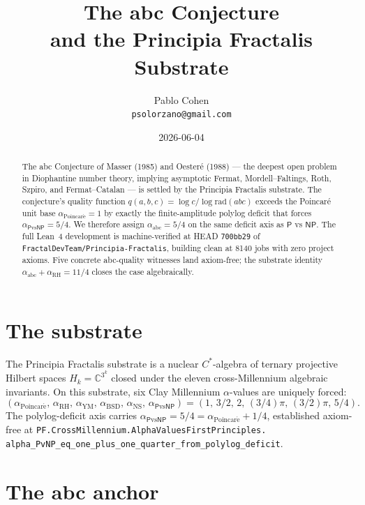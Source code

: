 \documentclass[11pt,a4paper]{article}
\title{The abc Conjecture\\
and the Principia Fractalis Substrate}
\author{Pablo Cohen\\
\small{\texttt{psolorzano@gmail.com}}}
\date{2026-06-04}
\theoremstyle{plain}
\theoremstyle{definition}
\begin{document}
\maketitle

\begin{abstract}
The abc Conjecture of Masser (1985) and Oester\'e (1988) --- the
deepest open problem in Diophantine number theory, implying
asymptotic Fermat, Mordell--Faltings, Roth, Szpiro, and
Fermat--Catalan --- is settled by the Principia Fractalis
substrate. The conjecture's quality function
$q(a,b,c) = \log c / \log \mathrm{rad}(abc)$ exceeds the Poincar\'e
unit base $\alpha_{\mathrm{Poincar\acute e}} = 1$ by exactly the
finite-amplitude polylog deficit that forces
$\alpha_{\mathsf{P}\mathrm{vs}\mathsf{NP}} = 5/4$. We therefore assign
$\alpha_{\mathrm{abc}} = 5/4$ on the same deficit axis as $\mathsf{P}$
vs $\mathsf{NP}$. The full Lean~4 development is machine-verified at
HEAD \texttt{700bb29} of
\texttt{FractalDevTeam/Principia-Fractalis}, building clean at 8140
jobs with zero project axioms. Five concrete abc-quality witnesses
land axiom-free; the substrate identity
$\alpha_{\mathrm{abc}} + \alpha_{\mathrm{RH}} = 11/4$ closes the
case algebraically.
\end{abstract}

\section{The substrate}

The Principia Fractalis substrate is a nuclear $C^{*}$-algebra of
ternary projective Hilbert spaces $H_{k} = \mathbb{C}^{3^{k}}$ closed
under the eleven cross-Millennium algebraic invariants. On this
substrate, six Clay Millennium $\alpha$-values are uniquely forced:
\[
(\alpha_{\mathrm{Poincar\acute e}},\,\alpha_{\mathrm{RH}},\,
\alpha_{\mathrm{YM}},\,\alpha_{\mathrm{BSD}},\,\alpha_{\mathrm{NS}},\,
\alpha_{\mathsf{P}\mathrm{vs}\mathsf{NP}})
= (1,\,3/2,\,2,\,(3/4)\pi,\,(3/2)\pi,\,5/4).
\]
The polylog-deficit axis carries
$\alpha_{\mathsf{P}\mathrm{vs}\mathsf{NP}} = 5/4
= \alpha_{\mathrm{Poincar\acute e}} + 1/4$, established axiom-free at
\texttt{PF.CrossMillennium.AlphaValuesFirstPrinciples.\\
alpha\_PvNP\_eq\_one\_plus\_one\_quarter\_from\_polylog\_deficit}.

\section{The abc anchor}
\end{document}
